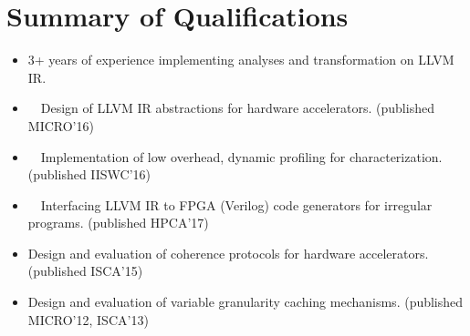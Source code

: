 \section{Summary of Qualifications}
\begin{itemize}[noitemsep,nolistsep]
\item 3+ years of experience implementing analyses and transformation on LLVM IR.
\item ~~Design of LLVM IR abstractions for hardware accelerators. (published MICRO'16)
\item ~~Implementation of low overhead, dynamic profiling for characterization. (published IISWC'16) 
\item ~~Interfacing LLVM IR to FPGA (Verilog) code generators for irregular programs. (published HPCA'17) 
\item Design and evaluation of coherence protocols for hardware accelerators. (published ISCA'15)
\item Design and evaluation of variable granularity caching mechanisms. (published MICRO'12, ISCA'13)
\end{itemize}
